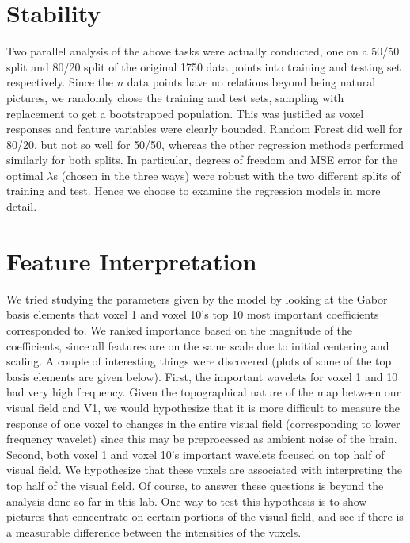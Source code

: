 \documentclass[english]{amsart}
\begin{document}
\section{Stability}

Two parallel analysis of the above tasks were actually conducted, one on a  50/50 split and 80/20 split of the original 1750 data points into training and testing set respectively.  Since the $n$ data points have no relations beyond being natural pictures, we randomly chose the training and test sets, sampling with replacement to get a bootstrapped population. This was justified as voxel responses and feature variables were clearly bounded.  Random Forest did well for 80/20, but not so well for 50/50, whereas the other regression methods performed similarly for both splits.  In particular, degrees of freedom and MSE error for the optimal $\lambda$s (chosen in the three ways) were robust with the two different splits of training and test.  Hence we choose to examine the regression models in more detail.  


\section{Feature Interpretation}

We tried studying the parameters given by the model by looking at the Gabor basis elements that voxel 1 and voxel 10's top 10 most important coefficients corresponded to.  We ranked importance based on the magnitude of the coefficients, since all features are on the same scale due to initial  centering and scaling.  A couple of interesting things were discovered (plots of some of the top basis elements are given below).  First, the important wavelets for voxel 1 and 10 had very high frequency.  Given the topographical nature of the map between our visual field and V1, we would hypothesize that it is more difficult to measure the response of one voxel to changes in the entire visual field (corresponding to lower frequency wavelet) since this may be preprocessed as ambient noise of the brain.  Second, both voxel 1 and voxel 10's important wavelets focused on top half of visual field. We hypothesize that these voxels are associated with interpreting the top half of the visual field. Of course, to answer these questions is beyond the analysis done so far in this lab.  One way to test this hypothesis is to show pictures that concentrate on certain portions of the visual field, and see if there is a measurable difference between the intensities of the voxels.  
\end{document}
